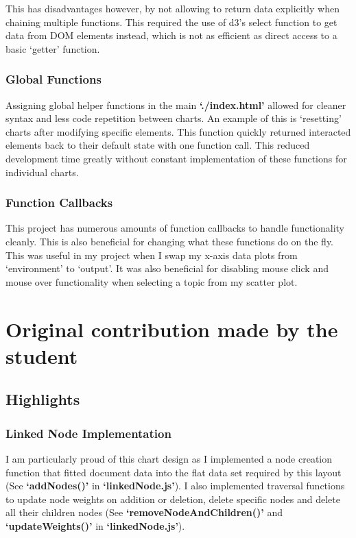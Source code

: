 \documentclass[a4paper, 11pt]{article}
\begin{document}
This has disadvantages however, by not allowing to return data explicitly when chaining multiple functions. This required the use of d3's select function to get data from DOM elements instead, which is not as efficient as direct access to a basic `getter' function.

\subsubsection{Global Functions}
Assigning global helper functions in the main \textbf{`./index.html'} allowed for cleaner syntax and less code repetition between charts. An example of this is `resetting' charts after modifying specific elements. This function quickly returned interacted elements back to their default state with one function call. This reduced development time greatly without constant implementation of these functions for individual charts.

\subsubsection{Function Callbacks}
This project has numerous amounts of function callbacks to handle functionality cleanly. This is also beneficial for changing what these functions do on the fly. This was useful in my project when I swap my x-axis data plots from `environment' to `output'. It was also beneficial for disabling mouse click and mouse over functionality when selecting a topic from my scatter plot.



\newpage
\section{Original contribution made by the student}
\subsection{Highlights} 
\subsubsection{Linked Node Implementation}
I am particularly proud of this chart design as I implemented a node creation function that fitted document data into the flat data set required by this layout (See \textbf{`addNodes()'} in \textbf{`linkedNode.js'}). I also implemented traversal functions to update node weights on addition or deletion, delete specific nodes and delete all their children nodes (See \textbf{`removeNodeAndChildren()'} and \textbf{`updateWeights()'} in \textbf{`linkedNode.js'}).
\end{document}
